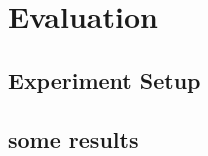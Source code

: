 \section{Evaluation}
\label{Section: evaluation}

\subsection{Experiment Setup}

\subsection{some results}


